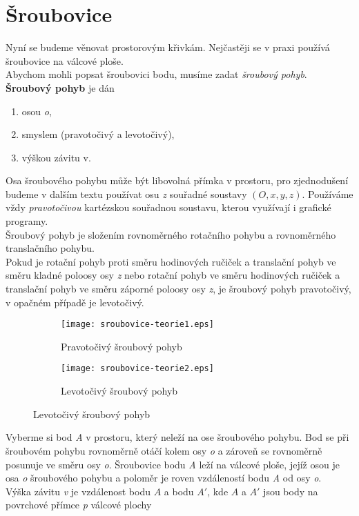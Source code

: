 \chapter{Šroubovice}
Nyní se budeme věnovat prostorovým křivkám. Nejčastěji se v praxi používá šroubovice na válcové ploše. \\
Abychom mohli popsat šroubovici bodu, musíme zadat \textit{šroubový pohyb}. \\[5pt]
\textbf{Šroubový pohyb} je dán
\begin{enumerate}
	\item osou \textit{o},
	\item smyslem (pravotočivý a levotočivý),
	\item výškou závitu v.
\end{enumerate}
Osa šroubového pohybu může být libovolná přímka v prostoru, pro zjednodušení budeme v dalším textu používat osu \textit{z}
souřadné soustavy $(O, x, y, z)$. Používáme vždy \textit{pravotočivou} kartézskou souřadnou soustavu, kterou využívají i grafické
programy. \\
Šroubový pohyb je složením rovnoměrného rotačního pohybu a rovnoměrného translačního pohybu. \\
Pokud je rotační pohyb proti směru hodinových ručiček a translační pohyb ve směru kladné poloosy osy \textit{z} nebo rotační pohyb
ve směru hodinových ručiček a translační pohyb ve směru záporné poloosy osy \textit{z}, je šroubový pohyb pravotočivý, v opačném
případě je levotočivý.
\begin{figure}[H]
	\centering
	\begin{subfigure}[b]{0.4\textwidth}
		\texttt{[image: sroubovice-teorie1.eps]}
		\caption{Pravotočivý šroubový pohyb}
	\end{subfigure}%
	\quad
	\begin{subfigure}[b]{0.4\textwidth}
		\texttt{[image: sroubovice-teorie2.eps]}
		\caption{Levotočivý šroubový pohyb}
	\end{subfigure}%
\end{figure}
\clearpage
\noindent Vyberme si bod \textit{A} v prostoru, který neleží na ose šroubového
pohybu. Bod se při šroubovém pohybu rovnoměrně otáčí kolem osy \textit{o} a zároveň se rovnoměrně posunuje ve směru osy \textit{o}.
Šroubovice bodu \textit{A} leží na válcové ploše, jejíž osou je osa \textit{o} šroubového pohybu a poloměr je roven vzdáleností bodu \textit{A} od osy \textit{o}. \\
Výška závitu \textit{v} je vzdálenost bodu $A$ a bodu $A'$, kde $A$ a $A'$ jsou body na povrchové přímce \textit{p} válcové plochy
